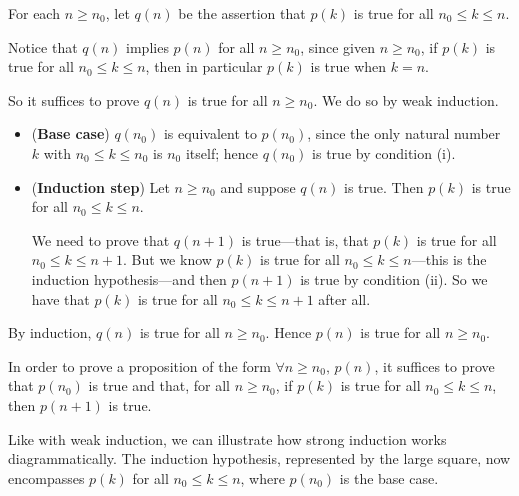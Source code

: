\begin{cproof}
For each $n \ge n_0$, let $q(n)$ be the assertion that $p(k)$ is true for all $n_0 \le k \le n$.

Notice that $q(n)$ implies $p(n)$ for all $n \ge n_0$, since given $n \ge n_0$, if $p(k)$ is true for all $n_0 \le k \le n$, then in particular $p(k)$ is true when $k=n$.

So it suffices to prove $q(n)$ is true for all $n \ge n_0$.
We do so by weak induction.

\begin{itemize}
\item (\textbf{Base case}) $q(n_0)$ is equivalent to $p(n_0)$, since the only natural number $k$ with $n_0 \le k \le n_0$ is $n_0$ itself; hence $q(n_0)$ is true by condition (i).

\item (\textbf{Induction step}) Let $n \ge n_0$ and suppose $q(n)$ is true. Then $p(k)$ is true for all $n_0 \le k \le n$.

We need to prove that $q(n+1)$ is true---that is, that $p(k)$ is true for all $n_0 \le k \le n+1$. But we know $p(k)$ is true for all $n_0 \le k \le n$---this is the induction hypothesis---and then $p(n+1)$ is true by condition (ii). So we have that $p(k)$ is true for all $n_0 \le k \le n+1$ after all.
\end{itemize}
By induction, $q(n)$ is true for all $n \ge n_0$. Hence $p(n)$ is true for all $n \ge n_0$.
\end{cproof}

\begin{strategy}
\label{strStrongInduction}
In order to prove a proposition of the form $\forall n \ge n_0,\, p(n)$, it suffices to prove that $p(n_0)$ is true and that, for all $n \ge n_0$, if $p(k)$ is true for all $n_0 \le k \le n$, then $p(n+1)$ is true.
\end{strategy}

Like with weak induction, we can illustrate how strong induction works diagrammatically. The induction hypothesis, represented by the large square, now encompasses $p(k)$ for all $n_0 \le k \le n$, where $p(n_0)$ is the base case.

\begin{center}
\end{center}

